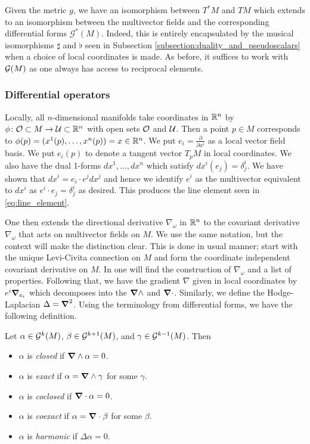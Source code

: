 \documentclass[12pt]{article}
\begin{document}
Given the metric $g$, we have an isomorphism between $T^*M$ and $TM$ which extends to an isomorphism between the multivector fields and the corresponding differential forms $\mathcal{G}^*(M)$.  Indeed, this is entirely encapsulated by the musical isomorphisms $\sharp$ and $\flat$ seen in Subsection \ref{subsection:duality_and_pseudoscalars} when a choice of local coordinates is made. As before, it suffices to work with $\mathcal{G}(M)$ as one always has access to reciprocal elements. 

\subsubsection{Differential operators}

Locally, all $n$-dimensional manifolds take coordinates in $\mathbb{R}^n$ by $\phi \colon \mathcal{O} \subset M \to \mathcal{U} \subset \mathbb{R}^n$ with open sets $\mathcal{O}$ and $\mathcal{U}$. Then a point $p\in M$ corresponds to $\phi(p)=(x^1(p),\dots,x^n(p))=x \in \mathbb{R}^n$. We put $e_i = \frac{\partial}{\partial x^i}$ as a local vector field basis. We put $e_i(p)$ to denote a tangent vector $T_pM$ in local coordinates.   We also have the dual 1-forms $dx^1,\dots,dx^n$ which satisfy $dx^i(e_j) = \delta^i_j$.  We have shown that $dx^i = e_i\cdot e^j dx^j$ and hence we identify $e^i$ as the multivector equivalent to $dx^i$ as $e^i \cdot e_j = \delta^i_j$ as desired. This produces the line element seen in \ref{eq:line_element}. 

One then extends the directional derivative $\nabla_\omega$ in $\mathbb{R}^n$ to the covariant derivative $\nabla_\omega$ that acts on multivector fields on $M$. We use the same notation, but the context will make the distinction clear. This is done in usual manner; start with the unique Levi-Civita connection on $M$ and form the coordinate independent covariant derivative on $M$. In \cite{schindler_geometric_2020} one will find the construction of $\nabla_\omega$ and a list of properties.  Following that, we have the gradient $\nabla$ given in local coordinates by $e^i \boldsymbol{\nabla}_{e_i}$ which decomposes into the $\boldsymbol{\nabla} \wedge$ and $\boldsymbol{\nabla} \cdot$.  Similarly, we define the Hodge-Laplacian $\Delta = \boldsymbol{\nabla}^2$. Using the terminology from differential forms, we have the following definition. 

\begin{definition}
Let $\alpha \in \mathcal{G}^{k}(M)$, $\beta \in \mathcal{G}^{k+1}(M)$, and $\gamma \in \mathcal{G}^{k-1}(M)$.  Then
\begin{itemize}
    \item $\alpha$ is \emph{closed} if $\boldsymbol{\nabla} \wedge \alpha =0$.
    \item $\alpha$ is \emph{exact} if $\alpha = \boldsymbol{\nabla} \wedge \gamma$ for some $\gamma$.
    \item $\alpha$ is \emph{coclosed} if $\boldsymbol{\nabla} \cdot \alpha = 0$.
    \item $\alpha$ is \emph{coexact} if $\alpha = \boldsymbol{\nabla} \cdot \beta$ for some $\beta$.
    \item $\alpha$ is \emph{harmonic} if $\Delta \alpha =0$.
\end{itemize}
\end{definition}
\end{document}
